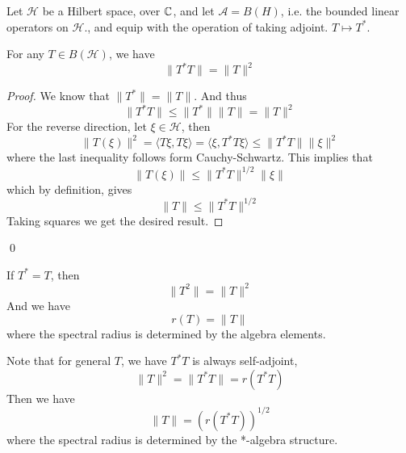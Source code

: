 Let $\mathcal{H}$ be a Hilbert space, over $\mathbb{C}$, and let $\mathcal{A}=B(H)$, i.e. the bounded linear operators on $\mathcal{H}$., and equip with the operation of taking adjoint. $T\mapsto T^*$.

\begin{proposition}
    For any $T\in B(\mathcal{H})$, we have
    \begin{equation*}
        \|T^*T\|=\|T\|^2
    \end{equation*}
\end{proposition}
\begin{proof}
    We know that $\|T^*\|=\|T\|$. And thus
    \begin{equation*}
        \|T^*T\|\leq\|T^*\|\|T\|=\|T\|^2
    \end{equation*}
    For the reverse direction, let $\xi\in\mathcal{H}$, then
    \begin{equation*}
        \|T(\xi)\|^2=\langle T\xi, T\xi\rangle=\langle \xi, T^*T\xi\rangle\leq \|T^*T\|\|\xi\|^2
    \end{equation*} 
    where the last inequality follows form Cauchy-Schwartz. This implies that
    \begin{equation*}
        \|T(\xi)\|\leq \|T^*T\|^{1/2}\|\xi\|
    \end{equation*}
    which by definition, gives
    \begin{equation*}
        \|T\|\leq\|T^*T\|^{1/2}
    \end{equation*}
    Taking squares we get the desired result.
\end{proof}
\qed

\begin{corollary}
    If $T^*=T$, then
    \begin{equation*}
        \|T^2\|=\|T\|^2
    \end{equation*}
    And we have
    \begin{equation*}
        r(T)=\|T\|
    \end{equation*}
    where the spectral radius is determined by the algebra elements.
\end{corollary}

Note that for general $T$, we have  $T^*T$ is always self-adjoint,
\begin{equation*}
    \|T\|^2=\|T^*T\|=r(T^*T)
\end{equation*}
Then we have
\begin{equation*}
    \|T\|=(r(T^*T))^{1/2}
\end{equation*}
where the spectral radius is determined by the *-algebra structure.